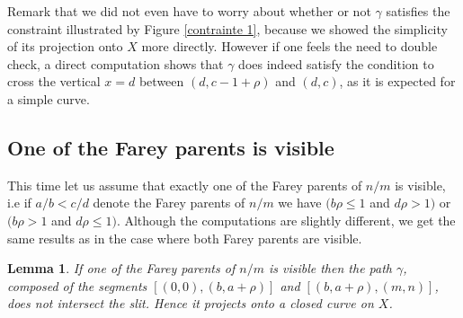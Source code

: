 \documentclass{article}
\newtheorem{lemma}[thm]{Lemma}
\theoremstyle{definition}
\begin{document}
Remark that we did not even have to worry about whether or not $\gamma$ satisfies the constraint illustrated by Figure \ref{contrainte 1}, because we showed the simplicity of its projection onto $X$ more directly. However if one feels the need to double check, a direct computation shows that $\gamma$ does indeed satisfy the condition to cross the vertical $x=d$ between $(d,c-1+\rho)$ and $(d,c)$, as it is expected for a simple curve.




\subsection{One of the Farey parents is visible}

This time let us assume that exactly one of the Farey parents of $n/m$ is visible, i.e if $a/b < c/d$ denote the Farey parents of $n/m$ we have $(b\rho\le 1$ and $d \rho> 1)$ or $(b\rho >1$ and $d \rho \le 1)$. Although the computations are slightly different, we get the same results as in the case where both Farey parents are visible.

\begin{lemma}
If one of the Farey parents of $n/m$ is visible then the path $\gamma$, composed of the segments $[(0,0),(b,a+\rho)]$ and $[(b,a+\rho),(m,n)]$, does not intersect the slit. Hence it projects onto a closed curve on $X$.
\end{lemma}
\end{document}
